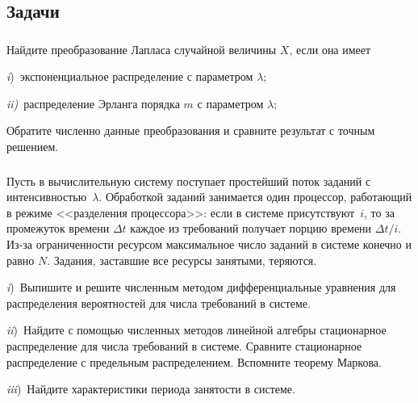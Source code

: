 \documentclass[12pt]{extarticle}
\begin{document}
\subsection{Задачи}
\subsubsection{}
  Найдите преобразование Лапласа случайной величины $X$, если она имеет\par
  \textit{i})~экспоненциальное распределение с параметром $\lambda$;\par
  \textit{ii)}~распределение Эрланга порядка $m$ с параметром $\lambda$;\par
  Обратите численно данные преобразования и сравните результат с точным решением.

\subsubsection{}
  \label{z:MM1-PS} Пусть в вычислительную систему поступает простейший
  поток заданий с интенсивностью~$\lambda$. Обработкой заданий занимается один
  процессор, работающий в режиме <<разделения процессора>>: если в системе
  присутствуют~$i$, то за промежуток времени $\Delta t$ каждое из требований
  получает порцию времени $\Delta t/i$. Из-за ограниченности ресурсом
  максимальное число заданий в системе конечно и равно $N$. Задания,
  заставшие все ресурсы занятыми, теряются. \par
  \textit{i})~Выпишите и решите численным методом дифференциальные уравнения для
  распределения вероятностей для числа требований в системе. \par
  \textit{ii})~Найдите с помощью численных методов линейной алгебры стационарное
  распределение для числа требований в системе. Сравните стационарное
  распределение с предельным распределением. Вспомните теорему Маркова.\par
  \textit{iii})~Найдите характеристики периода занятости в системе.


\end{document}
